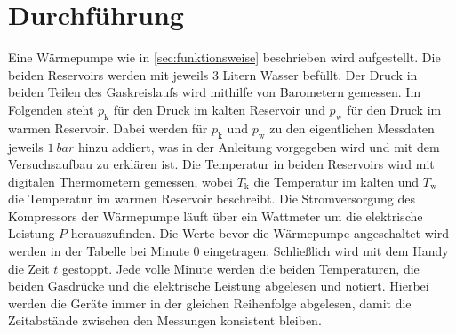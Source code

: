 \section{Durchführung}

Eine Wärmepumpe wie in \ref{sec:funktionsweise} beschrieben wird aufgestellt.
Die beiden Reservoirs werden mit jeweils 3 Litern Wasser befüllt.
Der Druck in beiden Teilen des Gaskreislaufs wird mithilfe von Barometern gemessen.
Im Folgenden steht $p_\text{k}$ für den Druck im kalten Reservoir und $p_\text{w}$ für den Druck im warmen Reservoir.
Dabei werden für $p_\text{k}$ und $p_\text{w}$ zu den eigentlichen Messdaten jeweils $\qty[]{1}{bar}$ hinzu addiert,
was in der Anleitung \cite[]{man:v206} vorgegeben wird und mit dem Versuchsaufbau zu erklären ist. 
Die Temperatur in beiden Reservoirs wird mit digitalen Thermometern gemessen,
wobei $T_\text{k}$ die Temperatur im kalten und $T_\text{w}$ die Temperatur im warmen Reservoir beschreibt.
Die Stromversorgung des Kompressors der Wärmepumpe läuft über ein Wattmeter um die elektrische Leistung $P$ herauszufinden.
Die Werte bevor die Wärmepumpe angeschaltet wird werden in der Tabelle bei Minute 0 eingetragen.
Schließlich wird mit dem Handy die Zeit $t$ gestoppt.
Jede volle Minute werden die beiden Temperaturen, die beiden Gasdrücke und die elektrische Leistung abgelesen und notiert.
Hierbei werden die Geräte immer in der gleichen Reihenfolge abgelesen, 
damit die Zeitabstände zwischen den Messungen konsistent bleiben.